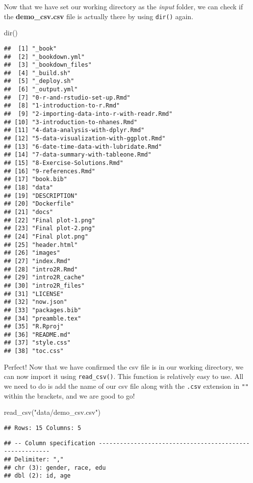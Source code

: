 \documentclass[
]{book}
\newenvironment{Shaded}{\begin{snugshade}}{\end{snugshade}}
\newcommand{\FunctionTok}[1]{\textcolor[rgb]{0.00,0.00,0.00}{#1}}
\newcommand{\NormalTok}[1]{#1}
\newcommand{\StringTok}[1]{\textcolor[rgb]{0.31,0.60,0.02}{#1}}
\begin{document}
Now that we have set our working directory as the \emph{input} folder, we can check if the \textbf{demo\_csv.csv} file is actually there by using \texttt{dir()} again.

\begin{Shaded}
\begin{Highlighting}[]
\FunctionTok{dir}\NormalTok{()}
\end{Highlighting}
\end{Shaded}

\begin{verbatim}
##  [1] "_book"
##  [2] "_bookdown.yml"
##  [3] "_bookdown_files"
##  [4] "_build.sh"
##  [5] "_deploy.sh"
##  [6] "_output.yml"
##  [7] "0-r-and-rstudio-set-up.Rmd"
##  [8] "1-introduction-to-r.Rmd"
##  [9] "2-importing-data-into-r-with-readr.Rmd"
## [10] "3-introduction-to-nhanes.Rmd"
## [11] "4-data-analysis-with-dplyr.Rmd"
## [12] "5-data-visualization-with-ggplot.Rmd"
## [13] "6-date-time-data-with-lubridate.Rmd"
## [14] "7-data-summary-with-tableone.Rmd"
## [15] "8-Exercise-Solutions.Rmd"
## [16] "9-references.Rmd"
## [17] "book.bib"
## [18] "data"
## [19] "DESCRIPTION"
## [20] "Dockerfile"
## [21] "docs"
## [22] "Final plot-1.png"
## [23] "Final plot-2.png"
## [24] "Final plot.png"
## [25] "header.html"
## [26] "images"
## [27] "index.Rmd"
## [28] "intro2R.Rmd"
## [29] "intro2R_cache"
## [30] "intro2R_files"
## [31] "LICENSE"
## [32] "now.json"
## [33] "packages.bib"
## [34] "preamble.tex"
## [35] "R.Rproj"
## [36] "README.md"
## [37] "style.css"
## [38] "toc.css"
\end{verbatim}

Perfect! Now that we have confirmed the csv file is in our working directory, we can now import it using \texttt{read\_csv()}. This function is relatively easy to use. All we need to do is add the name of our csv file along with the \texttt{.csv} extension in \texttt{""} within the brackets, and we are good to go!

\begin{Shaded}
\begin{Highlighting}[]
\FunctionTok{read\_csv}\NormalTok{(}\StringTok{"data/demo\_csv.csv"}\NormalTok{)}
\end{Highlighting}
\end{Shaded}

\begin{verbatim}
## Rows: 15 Columns: 5
\end{verbatim}

\begin{verbatim}
## -- Column specification --------------------------------------------------------
## Delimiter: ","
## chr (3): gender, race, edu
## dbl (2): id, age
\end{verbatim}
\end{document}
